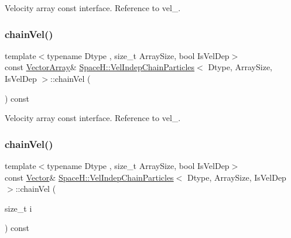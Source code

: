 Velocity array const interface. Reference to vel\+\_\+. 

\mbox{\label{class_space_h_1_1_vel_indep_chain_particles_a741064afd96c861eac50e8de239eedaa}} 
\subsubsection{\texorpdfstring{chain\+Vel()}{chainVel()}\hspace{0.1cm}{\footnotesize\ttfamily [2/4]}}
{\footnotesize\ttfamily template$<$typename Dtype , size\+\_\+t Array\+Size, bool Is\+Vel\+Dep$>$ \\
const \mbox{\hyperlink{class_space_h_1_1_vel_indep_particles_aa9983058940249df8b00fa800e8cbad2}{Vector\+Array}}\& \mbox{\hyperlink{class_space_h_1_1_vel_indep_chain_particles}{Space\+H\+::\+Vel\+Indep\+Chain\+Particles}}$<$ Dtype, Array\+Size, Is\+Vel\+Dep $>$\+::chain\+Vel (\begin{DoxyParamCaption}{ }\end{DoxyParamCaption}) const\hspace{0.3cm}{\ttfamily [inline]}}



Velocity array const interface. Reference to vel\+\_\+. 

\mbox{\label{class_space_h_1_1_vel_indep_chain_particles_a05d9529a4ee452b4c15efe92584a6d25}} 
\subsubsection{\texorpdfstring{chain\+Vel()}{chainVel()}\hspace{0.1cm}{\footnotesize\ttfamily [3/4]}}
{\footnotesize\ttfamily template$<$typename Dtype , size\+\_\+t Array\+Size, bool Is\+Vel\+Dep$>$ \\
const \mbox{\hyperlink{class_space_h_1_1_vel_indep_particles_a61bbcfdb0dc7f99f3c68af69a755c935}{Vector}}\& \mbox{\hyperlink{class_space_h_1_1_vel_indep_chain_particles}{Space\+H\+::\+Vel\+Indep\+Chain\+Particles}}$<$ Dtype, Array\+Size, Is\+Vel\+Dep $>$\+::chain\+Vel (\begin{DoxyParamCaption}\item[{size\+\_\+t}]{i }\end{DoxyParamCaption}) const\hspace{0.3cm}{\ttfamily [inline]}}



